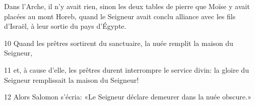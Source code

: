 Dans l’Arche, il n’y avait rien, sinon les deux tables de pierre que Moïse y avait placées au mont Horeb, quand le Seigneur avait conclu alliance avec les fils d’Israël, à leur sortie du pays d’Égypte.

10 Quand les prêtres sortirent du sanctuaire, la nuée remplit la maison du Seigneur,

11 et, à cause d’elle, les prêtres durent interrompre le service divin: la gloire du Seigneur remplissait la maison du Seigneur!

12 Alors Salomon s’écria: «Le Seigneur déclare demeurer dans la nuée obscure.»